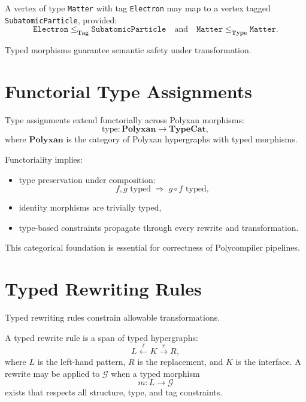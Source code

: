 \begin{example}
A vertex of type \texttt{Matter} with tag \texttt{Electron} may map to a vertex tagged \texttt{SubatomicParticle}, provided:
\[
\texttt{Electron} \le_{\mathbf{Tag}} \texttt{SubatomicParticle}
\quad\text{and}\quad
\texttt{Matter} \le_{\mathbf{Type}} \texttt{Matter}.
\]
\end{example}

Typed morphisms guarantee semantic safety under transformation.

\section{Functorial Type Assignments}

Type assignments extend functorially across Polyxan morphisms:
\[
\mathrm{type} : \mathbf{Polyxan} \to \mathbf{TypeCat},
\]
where $\mathbf{Polyxan}$ is the category of Polyxan hypergraphs with typed morphisms.

Functoriality implies:

\begin{itemize}
\item type preservation under composition:
\[
f, g \text{ typed} \;\Longrightarrow\; g \circ f \text{ typed},
\]
\item identity morphisms are trivially typed,
\item type-based constraints propagate through every rewrite and transformation.
\end{itemize}

This categorical foundation is essential for correctness of Polycompiler pipelines.

\section{Typed Rewriting Rules}

Typed rewriting rules constrain allowable transformations.

\begin{definition}
A typed rewrite rule is a span of typed hypergraphs:
\[
L \xleftarrow{\ell} K \xrightarrow{r} R,
\]
where $L$ is the left-hand pattern, $R$ is the replacement, and $K$ is the interface.  
A rewrite may be applied to $\mathcal{G}$ when a typed morphism
\[
m: L \to \mathcal{G}
\]
exists that respects all structure, type, and tag constraints.
\end{definition}

